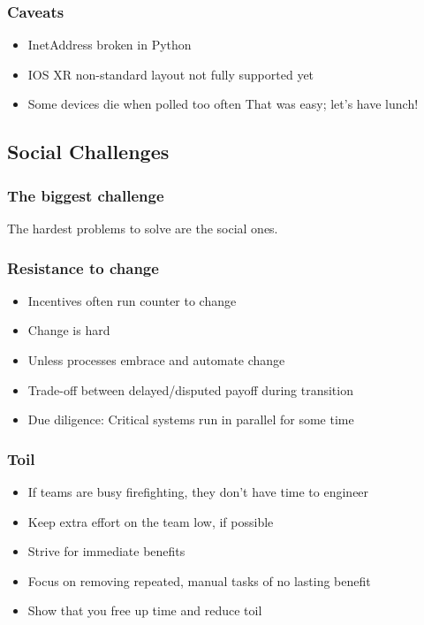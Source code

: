 \documentclass[t]{beamer}
\begin{document}
\begin{frame}
	\frametitle{Caveats}
	\begin{itemize}
		\item InetAddress broken in Python
		\item IOS XR non-standard layout not fully supported yet 
		\item Some devices die when polled too often
		\vfill
			That was easy; let's have lunch!
	\end{itemize}
\end{frame}


\subsection{Social Challenges}

\begin{frame}
	\frametitle{The biggest challenge}
		\begin{center}
			\vfill
			The hardest problems to solve are the social ones.
			\vfill
		\end{center}
\end{frame}

\begin{frame}
	\frametitle{Resistance to change}
	\begin{itemize}
		\item Incentives often run counter to change
		\item Change is hard
		\item Unless processes embrace and automate change
		\item Trade-off between delayed/disputed payoff during transition
		\item Due diligence: Critical systems run in parallel for some time
	\end{itemize}
\end{frame}

\begin{frame}
	\frametitle{Toil}
	\begin{itemize}
		\item If teams are busy firefighting, they don't have time to engineer
		\item Keep extra effort on the team low, if possible
		\item Strive for immediate benefits
		\item Focus on removing repeated, manual tasks of no lasting benefit
		\item Show that you free up time and reduce toil
	\end{itemize}
\end{frame}
\end{document}
